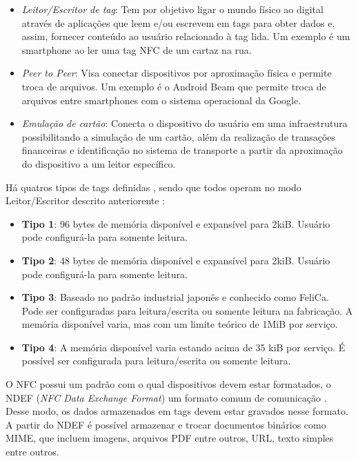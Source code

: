 \begin{itemize} \parskip -4pt
	\item \textit{Leitor/Escritor de tag}: Tem por objetivo ligar o mundo físico ao digital através 
	de aplicações que leem e/ou escrevem em tags para obter dados e, assim, fornecer conteúdo ao 
	usuário relacionado à tag lida. Um exemplo é um smartphone ao ler uma tag NFC de um cartaz na 
	rua.
	\item \textit{Peer to Peer}: Visa conectar dispositivos por aproximação física e permite troca 
	de arquivos. Um exemplo é o Android Beam que permite troca de arquivos entre smartphones com o 
	sistema operacional da Google.
	\item \textit{Emulação de cartão}: Conecta o dispositivo do usuário em uma infraestrutura 
	possibilitando a simulação de um cartão, além da realização de transações financeiras e 
	identificação no sistema de transporte a partir da aproximação do dispositivo a um leitor 
	específico.
\end{itemize}

Há quatros tipos de tags definidas \cite{NFCForum2016a}, sendo que todos operam no modo Leitor/Escritor descrito anteriorente : 

\begin{itemize} \parskip -4pt
	\item \textbf{Tipo 1}: 96 bytes de memória disponível e expansível para 2kiB. Usuário pode 
	configurá-la para somente leitura.
	\item \textbf{Tipo 2}: 48 bytes de memória disponível e expansível para 2kiB. Usuário pode 
	configurá-la para somente leitura.
	\item \textbf{Tipo 3}: Baseado no padrão industrial japonês e conhecido como FeliCa. Pode ser 
	configuradas para leitura/escrita ou somente leitura na fabricação. A memória disponível varia, 
	mas com um limite teórico de 1MiB por serviço.
	\item \textbf{Tipo 4}: A memória disponível varia estando acima de 35 kiB por serviço. É 
	possível ser configurada para leitura/escrita ou somente leitura.
\end{itemize}

O NFC possui um padrão com o qual dispositivos devem estar formatados, o NDEF (\textit{NFC Data Exchange Format}) um formato comum de comunicação \cite{Igoe2014}. Desse 
modo, os dados armazenados em tags devem estar gravados nesse formato. A partir do NDEF é possível armazenar e trocar documentos binários como MIME, que incluem imagens, arquivos PDF entre outros, 
URL, texto simples entre outros.



